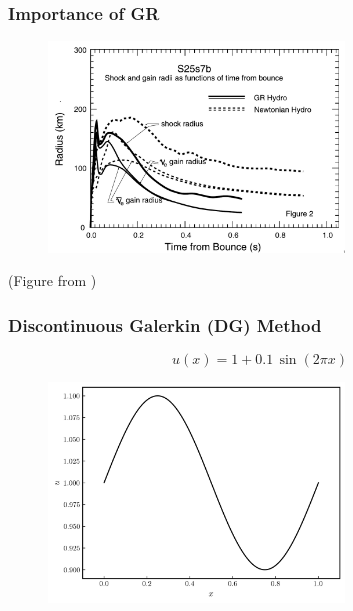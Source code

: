 \documentclass{beamer}
\begin{document}
\begin{frame}
\frametitle{Importance of GR}

  \begin{figure}[htb!]
    \centering
    \includegraphics[width=0.7\textwidth]{fig.WhyGR.png}
  \end{figure}
  \begin{center}(Figure from \citet{lmt2001})\end{center}

\end{frame}

\begin{frame}
\frametitle{Discontinuous Galerkin (DG) Method}

  \Fontvi

  \begin{equation*}
    u\left(x\right)=1+0.1\,\sin\left(2\pi x\right)
  \end{equation*}

  \begin{figure}[htb!]
    \centering
    \includegraphics[width=0.7\textwidth]{fig.sine.png}
  \end{figure}

\end{frame}
\end{document}

